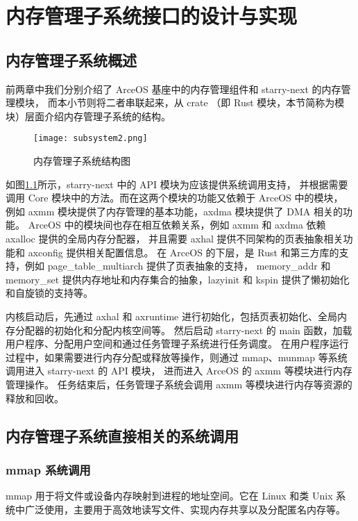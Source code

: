 

\chapter{内存管理子系统接口的设计与实现}

\section{内存管理子系统概述}

前两章中我们分别介绍了 ArceOS 基座中的内存管理组件和 starry-next 的内存管理模块，
而本小节则将二者串联起来，从 crate （即 Rust 模块，本节简称为模块）层面介绍内存管理子系统的结构。

\begin{figure}[H]
    \centering
    \texttt{[image: subsystem2.png]}
    \caption{内存管理子系统结构图}
    \label{fig:subsystem}
\end{figure}

如图\ref{fig:subsystem}所示，starry-next 中的 API 模块为应该提供系统调用支持，
并根据需要调用 Core 模块中的方法。而在这两个模块的功能又依赖于 ArceOS 中的模块，
例如 axmm 模块提供了内存管理的基本功能，axdma 模块提供了 DMA 相关的功能。
ArceOS 中的模块间也存在相互依赖关系，例如 axmm 和 axdma 依赖 axalloc 提供的全局内存分配器，
并且需要 axhal 提供不同架构的页表抽象相关功能和 axconfig 提供相关配置信息。
在 ArceOS 的下层，是 Rust 和第三方库的支持，例如 page\_table\_multiarch 提供了页表抽象的支持，
memory\_addr 和 memory\_set 提供内存地址和内存集合的抽象，lazyinit 和 kspin 提供了懒初始化和自旋锁的支持等。

内核启动后，先通过 axhal 和 axruntime 进行初始化，包括页表初始化、全局内存分配器的初始化和分配内核空间等。
然后启动 starry-next 的 main 函数，加载用户程序、分配用户空间和通过任务管理子系统进行任务调度。
在用户程序运行过程中，如果需要进行内存分配或释放等操作，则通过 mmap、munmap 等系统调用进入 starry-next 的 API 模块，
进而进入 ArceOS 的 axmm 等模块进行内存管理操作。
任务结束后，任务管理子系统会调用 axmm 等模块进行内存等资源的释放和回收。


\section{内存管理子系统直接相关的系统调用}

\subsection{mmap 系统调用}
mmap 用于将文件或设备内存映射到进程的地址空间。它在 Linux 和类 Unix 系统中广泛使用，主要用于高效地读写文件、实现内存共享以及分配匿名内存等。

